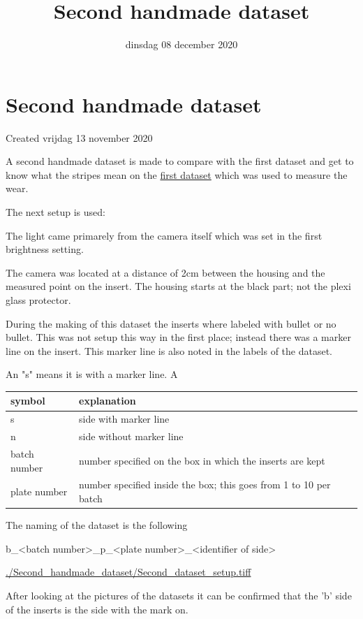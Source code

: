 \documentclass{scrartcl}
\title{Second handmade dataset}
\date{dinsdag 08 december 2020}
\author{}
\begin{document}
\maketitle

		\section{Second handmade dataset}

Created vrijdag 13 november 2020



A second handmade dataset is made to compare with the first dataset and get to know what the stripes mean on the \href{./initial_dataset.txt}{first dataset} which was used to measure the wear.



The next setup is used:

The light came primarely from the camera itself which was set in the first brightness setting. 

The camera was located at a distance of 2cm between the housing and the measured point on the insert. The housing starts at the black part; not the plexi glass protector. 

During the making of this dataset the inserts where labeled with bullet or no bullet. This was not setup this way in the first place; instead there was a marker line on the insert. This marker line is also noted in the labels of the dataset.

An "s" means it is with a marker line. A

\begin{tabular}{ |l|l| }
\hline
 symbol & explanation \tabularnewline
\hline
\hline
 s & side with marker line \tabularnewline
\hline
 n & side without marker line \tabularnewline
\hline
 batch number & number specified on the box in which the inserts are kept \tabularnewline
\hline
 plate number & number specified inside the box; this goes from 1 to 10 per batch \tabularnewline
\hline
\end{tabular}


The naming of the dataset is the following

b\_\textless{}batch number\textgreater{}\_p\_\textless{}plate number\textgreater{}\_\textless{}identifier of side\textgreater{}

\href{./Second_handmade_dataset/Second_dataset_setup.tiff}{./Second_handmade_dataset/Second_dataset_setup.tiff}

After looking at the pictures of the datasets it can be confirmed that the 'b' side of the inserts is the side with the mark on. 
\end{document}
